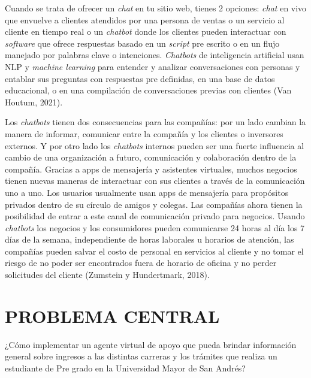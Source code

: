 \documentclass[letter, openright, 12pt]{book}
\begin{document}
Cuando se trata de ofrecer un \textit{chat} en tu sitio web, tienes 2 opciones: \textit{chat} en vivo que envuelve a clientes atendidos por una persona de ventas o un servicio al cliente en tiempo real o un \textit{chatbot} donde los clientes pueden interactuar con \textit{software} que ofrece respuestas basado en un \textit{script} pre escrito o en un flujo manejado por palabras clave o intenciones. \textit{Chatbots} de inteligencia artificial usan NLP y \textit{machine learning} para entender y analizar conversaciones con personas y entablar sus preguntas con respuestas pre definidas, en una base de datos educacional, o en una compilación de conversaciones previas con clientes (Van Houtum, 2021). 
\par 
Los \textit{chatbots} tienen dos consecuencias para las compañías: por un lado cambian la manera de informar, comunicar entre la compañía y los clientes o inversores externos. Y por otro lado los \textit{chatbots} internos pueden ser una fuerte influencia al cambio de una organización a futuro, comunicación y colaboración dentro de la compañía. Gracias a apps de mensajería y asistentes virtuales, muchos negocios tienen nuevas maneras de interactuar con sus clientes a través de la comunicación uno a uno. Los usuarios usualmente usan apps de mensajería para propósitos privados dentro de su círculo de amigos y colegas. Las compañías ahora tienen la posibilidad de entrar a este canal de comunicación privado para negocios. Usando \textit{chatbots} los negocios y los consumidores pueden comunicarse 24 horas al día los 7 días de la semana, independiente de horas laborales u horarios de atención, las compañías pueden salvar el costo de personal en servicios al cliente y no tomar el riesgo de no poder ser encontrados fuera de horario de oficina y no perder solicitudes del cliente (Zumstein y Hundertmark, 2018).

\section{PROBLEMA CENTRAL}
¿Cómo implementar un agente virtual de apoyo que pueda brindar información general sobre ingresos a las distintas carreras y los trámites que realiza un estudiante de Pre grado en la Universidad Mayor de San Andrés? 
\end{document}
